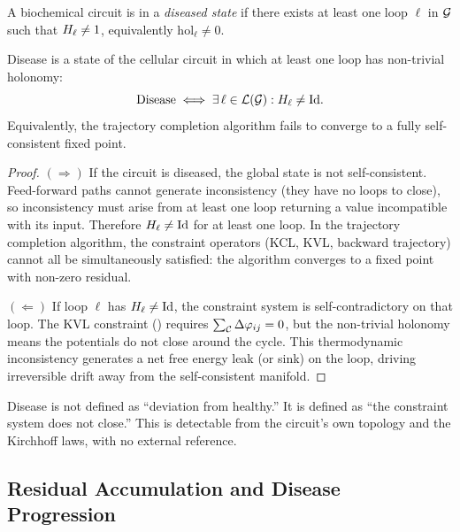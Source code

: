 \begin{definition}
\label{def:topo-disease}
A biochemical circuit is in a \emph{diseased state} if there exists at
least one loop $\ell$ in $\mathcal{G}$ such that $H_\ell \neq 1$, equivalently
$\mathrm{hol}_\ell \neq 0$.
\end{definition}

\begin{theorem}
\label{thm:disease-inconsistency}
Disease is a state of the cellular circuit in which at least one loop has
non-trivial holonomy:
\begin{equation}
  \text{Disease}
  \iff
  \exists\, \ell \in \mathcal{L}(\mathcal{G}) : H_\ell \neq \mathrm{Id}.
  \label{eq:disease-condition}
\end{equation}
Equivalently, the trajectory completion algorithm fails to converge to a
fully self-consistent fixed point.
\end{theorem}

\begin{proof}
$(\Rightarrow)$ If the circuit is diseased, the global state is not
self-consistent.  Feed-forward paths cannot generate inconsistency (they
have no loops to close), so inconsistency must arise from at least one
loop returning a value incompatible with its input.  Therefore
$H_\ell \neq \mathrm{Id}$ for at least one loop.  In the trajectory
completion algorithm, the constraint operators (KCL, KVL, backward
trajectory) cannot all be simultaneously satisfied: the algorithm converges
to a fixed point with non-zero residual.

$(\Leftarrow)$ If loop $\ell$ has $H_\ell \neq \mathrm{Id}$, the
constraint system is self-contradictory on that loop.  The KVL constraint
() requires $\sum_{\mathcal{C}} \Delta\varphi_{ij} = 0$,
but the non-trivial holonomy means the potentials do not close around the
cycle.  This thermodynamic inconsistency generates a net free energy leak
(or sink) on the loop, driving irreversible drift away from the
self-consistent manifold.
\end{proof}

\begin{remark}
Disease is not defined as ``deviation from healthy.''  It is defined as
``the constraint system does not close.''  This is detectable from the
circuit's own topology and the Kirchhoff laws, with no external reference.
\end{remark}

\subsection{Residual Accumulation and Disease Progression}

